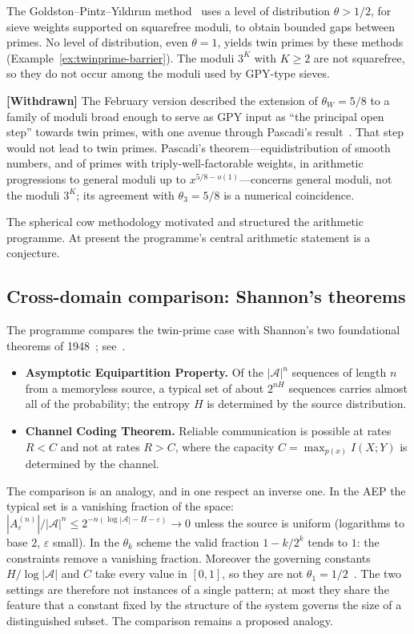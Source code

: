 \documentclass[12pt]{amsart}
\theoremstyle{plain}
\theoremstyle{definition}
\theoremstyle{remark}
\begin{document}
The Goldston--Pintz--Y{\i}ld{\i}r{\i}m method~\cite{GPY2009} uses a level of
distribution $\theta > 1/2$, for sieve weights supported on squarefree moduli,
to obtain bounded gaps between primes. No level of distribution, even
$\theta = 1$, yields twin primes by these methods
(Example~\ref{ex:twinprime-barrier}). The moduli $3^K$ with $K \geq 2$ are not
squarefree, so they do not occur among the moduli used by GPY-type sieves.

\textbf{[Withdrawn]} The February version described the extension of
$\theta_W = 5/8$ to a family of moduli broad enough to serve as GPY input as
``the principal open step'' towards twin primes, with one avenue through
Pascadi's result~\cite{Pascadi2025}. That step would not lead to twin primes.
Pascadi's theorem---equidistribution of smooth numbers, and of primes with
triply-well-factorable weights, in arithmetic progressions to general moduli up
to $x^{5/8-o(1)}$---concerns general moduli, not the moduli $3^K$; its agreement
with $\theta_3 = 5/8$ is a numerical coincidence.

The spherical cow methodology motivated and structured the arithmetic
programme. At present the programme's central arithmetic statement is a
conjecture.

\subsection{Cross-domain comparison: Shannon's theorems}
\label{sec:shannon}

The programme compares the twin-prime case with Shannon's two foundational
theorems of 1948~\cite{Shannon1948}; see~\cite{WakilShannon}.

\begin{itemize}
  \item \textbf{Asymptotic Equipartition Property.} Of the $|\mathcal{A}|^n$
    sequences of length $n$ from a memoryless source, a typical set of about
    $2^{nH}$ sequences carries almost all of the probability; the entropy $H$
    is determined by the source distribution.
  \item \textbf{Channel Coding Theorem.} Reliable communication is possible at
    rates $R < C$ and not at rates $R > C$, where the capacity
    $C = \max_{p(x)} I(X;Y)$ is determined by the channel.
\end{itemize}

The comparison is an analogy, and in one respect an inverse one. In the AEP the
typical set is a vanishing fraction of the space:
$|A_\varepsilon^{(n)}|/|\mathcal{A}|^n \leq 2^{-n(\log|\mathcal{A}| - H - \varepsilon)}
\to 0$ unless the source is uniform (logarithms to base $2$, $\varepsilon$
small). In the $\theta_k$ scheme the valid fraction $1 - k/2^k$ tends to $1$:
the constraints remove a vanishing fraction. Moreover the governing constants
$H/\log|\mathcal{A}|$ and $C$ take every value in $[0,1]$, so they are not
$\theta_1 = 1/2$~\cite[Section~3.3]{WakilCF}. The two settings are therefore
not instances of a single pattern; at most they share the feature that a
constant fixed by the structure of the system governs the size of a
distinguished subset. The comparison remains a proposed analogy.
\end{document}
